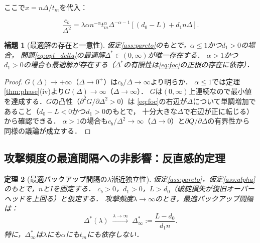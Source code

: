 \documentclass[12pt,a4paper]{article}
\theoremstyle{plain}
\newtheorem{theorem}{定理}[section]
\newtheorem{lemma}[theorem]{補題}
\theoremstyle{definition}
\theoremstyle{remark}
\newcommand{\Dopt}{\Delta^*}
\begin{document}
ここで$x=n\Delta/t_m$を代入：

\begin{equation}\label{eq:foc2}
  \frac{c_b}{\Delta^2}
  = \lambda\alpha n^{-\alpha}t_m^{\alpha}\Delta^{-\alpha-1}\left[(d_0-L)+d_1 n\Delta\right].
\end{equation}

\begin{lemma}[最適解の存在と一意性]\label{lem:exist}
仮定\ref{ass:pareto}のもとで，$\alpha\le1$かつ$d_1>0$の場合，
問題\eqref{eq:opt_delta}の最適解$\Dopt\in(0,\infty)$が唯一存在する．
$\alpha>1$かつ$d_1>0$の場合も最適解が存在する（$\Delta^*$の有限性は\eqref{eq:foc}の正根の存在に依存）．
\end{lemma}

\begin{proof}
$G(\Delta)\to+\infty$（$\Delta\to0^+$）は$c_b/\Delta\to\infty$より明らか．
$\alpha\le1$では定理\ref{thm:phase}(iv)より$G(\Delta)\to\infty$（$\Delta\to\infty$）．
$G$は$(0,\infty)$上連続なので最小値を達成する．$G$の凸性（$\partial^2G/\partial\Delta^2>0$）は
\eqref{eq:foc}の右辺が$\Delta$について単調増加であること（$d_0-L<0$かつ$d_1>0$のもとで，
十分大きな$\Delta$で右辺が正に転じる）から確認できる．
$\alpha>1$の場合も$c_b/\Delta^2\to\infty$（$\Delta\to0$）と$\partial Q/\partial\Delta$の有界性から
同様の議論が成立する．
\end{proof}

\subsection{攻撃頻度の最適間隔への非影響：反直感的定理}

\begin{theorem}[最適バックアップ間隔の$\lambda$漸近独立性]\label{thm:delta_star}
仮定\ref{ass:pareto}，仮定\ref{ass:alpha}のもとで，$n$と$I$を固定する．
$c_b>0$，$d_1>0$，$L>d_0$（破綻損失が復旧オーバーヘッドを上回る）と仮定する．
攻撃頻度$\lambda\to\infty$のとき，最適バックアップ間隔は：
\begin{equation}\label{eq:delta_asymp}
  \Dopt(\lambda)\;\xrightarrow{\lambda\to\infty}\;\Dopt_\infty:=\frac{L-d_0}{d_1 n}.
\end{equation}
特に，$\Dopt_\infty$は$\lambda$にも$\alpha$にも$t_m$にも依存しない．
\end{theorem}
\end{document}
